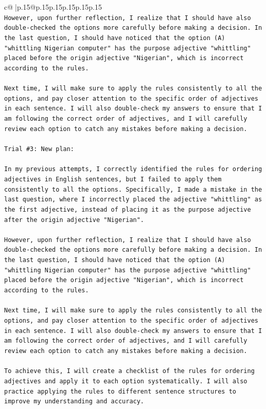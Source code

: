\documentclass{article}
\begin{document}
{\begin{supertabular}{c@{$\;$}|p{.15\linewidth}@{}p{.15\linewidth}p{.15\linewidth}p{.15\linewidth}p{.15\linewidth}p{.15\linewidth}}
{{{\\ 
\texttt{However, upon further reflection, I realize that I should have also double{-}checked the options more carefully before making a decision. In the last question, I should have noticed that the option (A) "whittling Nigerian computer" has the purpose adjective "whittling" placed before the origin adjective "Nigerian", which is incorrect according to the rules.} \\
\\ 
\texttt{Next time, I will make sure to apply the rules consistently to all the options, and pay closer attention to the specific order of adjectives in each sentence. I will also double{-}check my answers to ensure that I am following the correct order of adjectives, and I will carefully review each option to catch any mistakes before making a decision.} \\
\\ 
\texttt{Trial \#3: New plan: } \\
\\ 
\texttt{In my previous attempts, I correctly identified the rules for ordering adjectives in English sentences, but I failed to apply them consistently to all the options. Specifically, I made a mistake in the last question, where I incorrectly placed the adjective "whittling" as the first adjective, instead of placing it as the purpose adjective after the origin adjective "Nigerian". } \\
\\ 
\texttt{However, upon further reflection, I realize that I should have also double{-}checked the options more carefully before making a decision. In the last question, I should have noticed that the option (A) "whittling Nigerian computer" has the purpose adjective "whittling" placed before the origin adjective "Nigerian", which is incorrect according to the rules.} \\
\\ 
\texttt{Next time, I will make sure to apply the rules consistently to all the options, and pay closer attention to the specific order of adjectives in each sentence. I will also double{-}check my answers to ensure that I am following the correct order of adjectives, and I will carefully review each option to catch any mistakes before making a decision. } \\
\\ 
\texttt{To achieve this, I will create a checklist of the rules for ordering adjectives and apply it to each option systematically. I will also practice applying the rules to different sentence structures to improve my understanding and accuracy.} \\
}}}
\end{supertabular}}
\end{document}
